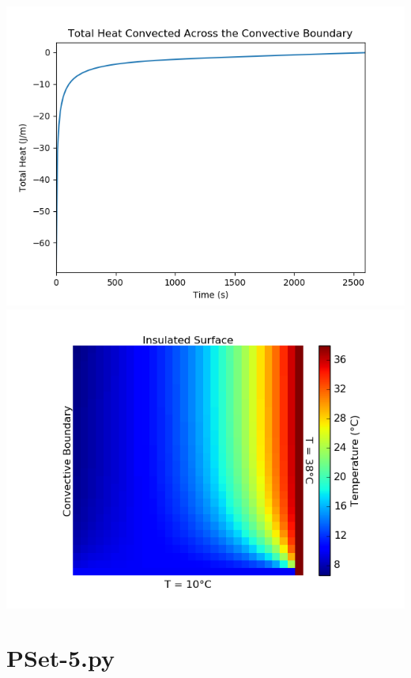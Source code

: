 \documentclass[12pt]{article}
\begin{document}
\clearpage
\includegraphics[width=\textwidth]{Problem-Set-5-Figure-4.png}
\clearpage
\includegraphics[width=\textwidth]{Problem-Set-5-Figure-5.png}
\clearpage

\section{PSet-5.py}

\end{document}
